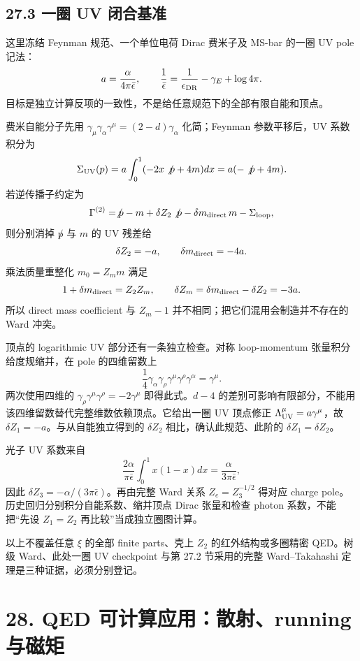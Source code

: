 \documentclass[
  11pt,
  oneside]{book}
\begin{document}
\hypertarget{ux4e00ux5708-uv-ux95edux5408ux57faux51c6}{%
\section{27.3 一圈 UV
闭合基准}\label{ux4e00ux5708-uv-ux95edux5408ux57faux51c6}}

这里冻结 Feynman 规范、一个单位电荷 Dirac 费米子及 MS-bar 的一圈 UV pole
记法： \[
a=\frac{\alpha}{4\pi\bar\epsilon},\qquad
\frac1{\bar\epsilon}=\frac1{\epsilon_{\rm DR}}-\gamma_E+\log4\pi.
\] 目标是独立计算反项的一致性，不是给任意规范下的全部有限自能和顶点。

费米自能分子先用
\(\gamma_\mu\gamma_\alpha\gamma^\mu=(2-d)\gamma_\alpha\) 化简；Feynman
参数平移后，UV 系数积分为 \[
\Sigma_{\rm UV}(p)=a\int_0^1(-2x\not p+4m)dx
=a(-\not p+4m).
\] 若逆传播子约定为 \[
\Gamma^{(2)}=\not p-m+\delta Z_2\not p
-\delta m_{\rm direct}\,m-\Sigma_{\rm loop},
\] 则分别消掉 \(\not p\) 与 \(m\) 的 UV 残差给 \[
\delta Z_2=-a,\qquad\delta m_{\rm direct}=-4a.
\] 乘法质量重整化 \(m_0=Z_m m\) 满足 \[
1+\delta m_{\rm direct}=Z_2Z_m,
\qquad\delta Z_m=\delta m_{\rm direct}-\delta Z_2=-3a.
\] 所以 direct mass coefficient 与 \(Z_m-1\)
并不相同；把它们混用会制造并不存在的 Ward 冲突。

顶点的 logarithmic UV 部分还有一条独立检查。对称 loop-momentum
张量积分给度规缩并，在 pole 的四维留数上 \[
\frac14\gamma_\alpha\gamma_\rho\gamma^\mu
\gamma^\rho\gamma^\alpha=\gamma^\mu.
\] 两次使用四维的 \(\gamma_\rho\gamma^\mu\gamma^\rho=-2\gamma^\mu\)
即得此式。\(d-4\)
的差别可影响有限部分，不能用该四维留数替代完整维数依赖顶点。它给出一圈
UV 顶点修正 \(\Lambda^\mu_{\rm UV}=a\gamma^\mu\)，故
\(\delta Z_1=-a\)。与从自能独立得到的 \(\delta Z_2\)
相比，确认此规范、此阶的 \(\delta Z_1=\delta Z_2\)。

光子 UV 系数来自 \[
\frac{2\alpha}{\pi\bar\epsilon}\int_0^1x(1-x)dx
=\frac{\alpha}{3\pi\bar\epsilon},
\] 因此 \(\delta Z_3=-\alpha/(3\pi\bar\epsilon)\)。再由完整 Ward 关系
\(Z_e=Z_3^{-1/2}\) 得对应 charge
pole。历史回归分别积分自能系数、缩并顶点 Dirac 张量和检查 photon
系数，不能把``先设 \(Z_1=Z_2\) 再比较''当成独立圈图计算。

以上不覆盖任意 \(\xi\) 的全部 finite parts、壳上 \(Z_2\)
的红外结构或多圈精密 QED。树级 Ward、此处一圈 UV checkpoint 与第 27.2
节采用的完整 Ward--Takahashi 定理是三种证据，必须分别登记。

\hypertarget{ch-28}{%
\chapter{28. QED 可计算应用：散射、running 与磁矩}\label{ch-28}}
\end{document}
